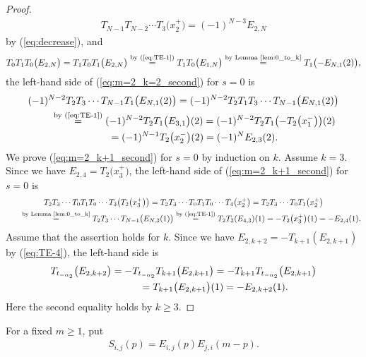 \documentclass[pdftex]{sigma}
\theoremstyle{definition}
\numberwithin{equation}{section}
\begin{document}
\begin{proof}
\begin{gather*}
T_{N-1} T_{N-2} \cdots T_3 \big(x_2^+\big) = (-1)^{N-3} E_{2,N}
\end{gather*}
by (\ref{eq:decrease}), and
\begin{gather*}
T_0 T_1 T_0 \big(E_{2,N}\big) = T_1 T_0 T_1 \big(E_{2,N}\big) \overset{\text{by (\ref{eq:TE-1})}}{=} T_1 T_0 \big(E_{1,N}\big)
\overset{\text{by Lemma~\ref{lem:0_to_k}}}{=} T_1\big({-}E_{N,1}(2)\big),
\end{gather*}
the left-hand side of (\ref{eq:m=2_k=2_second}) for $s=0$ is
\begin{gather*}
(-1)^{N-2} T_2 T_3 \cdots T_{N-1} T_1 \big(E_{N,1}(2)\big) = (-1)^{N-2} T_2 T_1 T_3 \cdots T_{N-1} \big(E_{N,1}(2)\big) \\
\qquad{} \overset{\text{by (\ref{eq:TE-1})}}{=} (-1)^{N-2} T_2 T_1 \big(E_{3,1}\big) (2)= (-1)^{N-2} T_2 T_1 \big({-}T_2\big(x_1^-\big)\big)(2) \\
\qquad {} = (-1)^{N-1} T_2 \big(x_2^-\big)(2) = (-1)^N E_{2,3}(2).
\end{gather*}
We prove (\ref{eq:m=2_k+1_second}) for $s=0$ by induction on $k$. Assume $k=3$. Since we have $E_{2,4}=T_2\big(x_3^+\big)$, the left-hand side of (\ref{eq:m=2_k+1_second}) for $s=0$ is
\begin{gather*}
T_2 T_3 \cdots T_0 T_1 T_0 \cdots T_3\big(T_2\big(x_3^+\big)\big) = T_2 T_3 \cdots T_0 T_1 T_0 \cdots T_{4} \big(x_{2}^+\big) = T_2 T_3 \cdots T_0 T_1 \big(x_2^+\big) \\
\qquad \overset{\text{by Lemma~\ref{lem:0_to_k}}}{=} T_2 T_3 \cdots T_{N-1} \big(E_{N,3}(1)\big)\overset{\text{by (\ref{eq:TE-1})} }{=} T_2 T_3 (E_{4,3}) (1) = - T_2\big(x_3^+\big)(1) = -E_{2,4}(1).
\end{gather*}
Assume that the assertion holds for $k$.
Since we have $E_{2,k+2} = -T_{k+1}(E_{2,k+1})$ by (\ref{eq:TE-4}), the left-hand side is
\begin{gather*}
T_{t_{-\alpha_2}}\big(E_{2,k+2}\big) = -T_{t_{-\alpha_2}} T_{k+1}\big(E_{2,k+1}\big) = -T_{k+1} T_{t_{-\alpha_2}}\big(E_{2,k+1}\big)\\
\hphantom{T_{t_{-\alpha_2}}\big(E_{2,k+2}\big)}{} = T_{k+1} \big(E_{2,k+1}\big)(1) = -E_{2,k+2}(1).
\end{gather*}
Here the second equality holds by $k \geq 3$.
\end{proof}

For a fixed $m \geq 1$, put
\begin{gather*}
S_{i,j}(p) = E_{i,j}(p)E_{j,i}(m-p).
\end{gather*}
\end{document}
